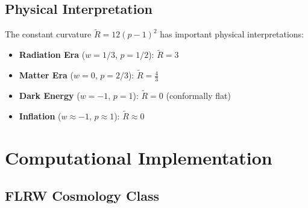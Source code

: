 \documentclass[11pt,a4paper]{article}
\begin{document}
\subsection{Physical Interpretation}

The constant curvature $\tilde{R} = 12(p-1)^2$ has important physical interpretations:

\begin{itemize}
\item \textbf{Radiation Era} ($w = 1/3$, $p = 1/2$): $\tilde{R} = 3$
\item \textbf{Matter Era} ($w = 0$, $p = 2/3$): $\tilde{R} = \frac{4}{3}$
\item \textbf{Dark Energy} ($w = -1$, $p = 1$): $\tilde{R} = 0$ (conformally flat)
\item \textbf{Inflation} ($w \approx -1$, $p \approx 1$): $\tilde{R} \approx 0$
\end{itemize}

\section{Computational Implementation}

\subsection{FLRW Cosmology Class}
\end{document}
